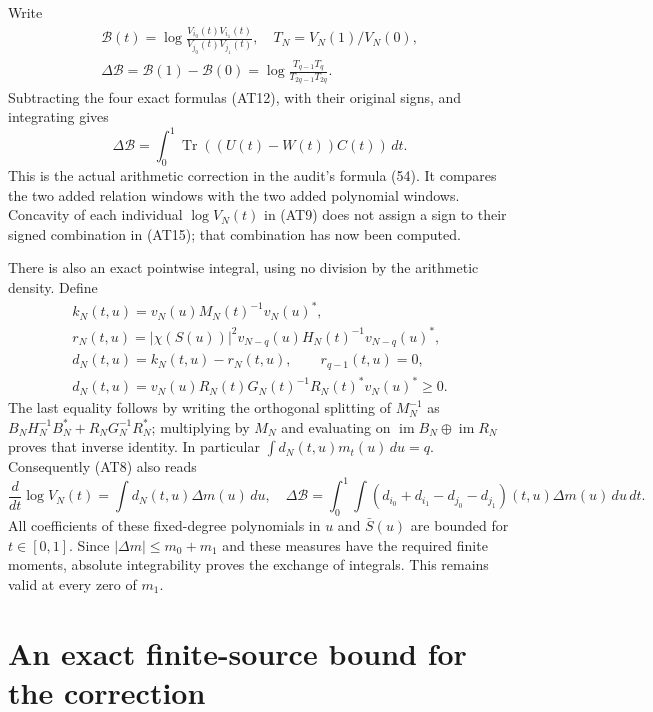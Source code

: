 \documentclass{article}
\newcommand{\Tr}{\operatorname{Tr}}
\newcommand{\im}{\operatorname{im}}
\begin{document}
Write
\[
 \begin{gathered}
 \mathcal B(t)=\log\frac{V_{i_0}(t)V_{i_1}(t)}{V_{j_0}(t)V_{j_1}(t)},
 \quad T_N=V_N(1)/V_N(0),\\
 \Delta\mathcal B=\mathcal B(1)-\mathcal B(0)
 =\log\frac{T_{q-1}T_q}{T_{2q-1}T_{2q}}.       \end{gathered}
 \tag{AT14}
\]
Subtracting the four exact formulas (AT12), with their original
signs, and integrating gives
\[
 \boxed{\displaystyle
 \Delta\mathcal B=\int_0^1\Tr((U(t)-W(t))C(t))\,dt .}
                                                        \tag{AT15}
\]
This is the actual arithmetic correction in the audit's formula
(54). It compares the two added relation windows with the two
added polynomial windows. Concavity of each individual
$\log V_N(t)$ in (AT9) does not assign a sign to their signed
combination in (AT15); that combination has now been computed.

There is also an exact pointwise integral, using no division by
the arithmetic density. Define
\[
 \begin{gathered}
 k_N(t,u)=v_N(u)M_N(t)^{-1}v_N(u)^*,\\
 r_N(t,u)=|\chi(S(u))|^2
 v_{N-q}(u)H_N(t)^{-1}v_{N-q}(u)^*,\\
 d_N(t,u)=k_N(t,u)-r_N(t,u),\qquad r_{q-1}(t,u)=0,\\
 d_N(t,u)=v_N(u)R_N(t)G_N(t)^{-1}R_N(t)^*v_N(u)^*\ge0.
                                                        \end{gathered}
 \tag{AT16}
\]
The last equality follows by writing the orthogonal splitting
of $M_N^{-1}$ as
$B_NH_N^{-1}B_N^*+R_NG_N^{-1}R_N^*$; multiplying by $M_N$
and evaluating on $\im B_N\oplus\im R_N$ proves that inverse
identity. In particular $\int d_N(t,u)m_t(u)\,du=q$.
Consequently (AT8) also reads
\[
 \frac{d}{dt}\log V_N(t)=\int d_N(t,u)\Delta m(u)\,du,
\quad
 \Delta\mathcal B=\int_0^1\int
 (d_{i_0}+d_{i_1}-d_{j_0}-d_{j_1})(t,u)\Delta m(u)\,du\,dt.
                                                        \tag{AT17}
\]
All coefficients of these fixed-degree polynomials in $u$ and
$\bar S(u)$ are bounded for $t\in[0,1]$. Since
$|\Delta m|\le m_0+m_1$ and these measures have the required
finite moments, absolute integrability proves the exchange of
integrals. This remains valid at every zero of $m_1$.

\section{An exact finite-source bound for the correction}
\end{document}
